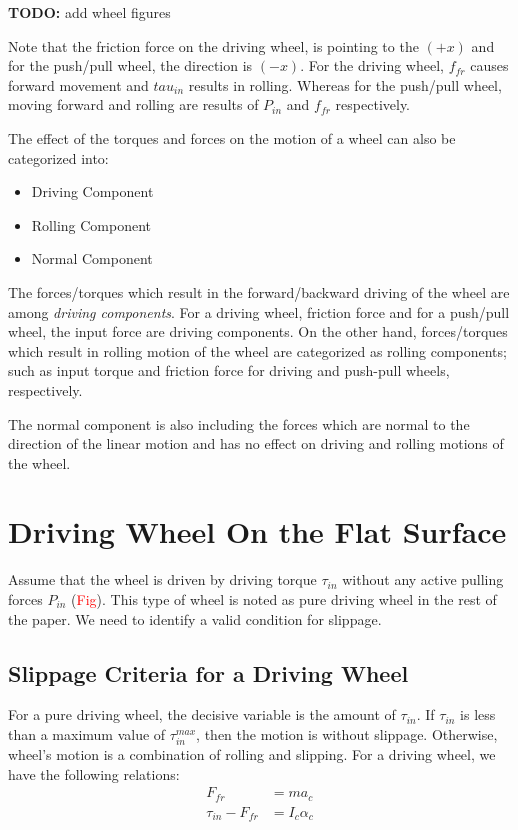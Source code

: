 \documentclass[letterpaper, 10pt, conference]{ieeeconf}
\newcommand{\TODO}[1]{{\color{red} {\bf TODO:} {#1}}}
\begin{document}
\TODO{add wheel figures}

Note that the friction force on the driving wheel, is pointing to the $(+x)$ and for the push/pull wheel, the direction is $(-x)$. For the driving wheel, $f_{fr}$ causes forward movement and $tau_{in}$ results in rolling. Whereas for the push/pull wheel, moving forward and rolling are results of $P_{in}$ and $f_{fr}$ respectively.

The effect of the torques and forces on the motion of a wheel can also be categorized into:
\begin{itemize}
\item Driving Component
\item Rolling Component
\item Normal Component
\end{itemize}

The forces/torques which result in the forward/backward driving of the wheel are among \emph{driving components}. For a driving wheel, friction force and for a push/pull wheel, the input force are driving components. On the other hand, forces/torques which result in rolling motion of the wheel are categorized as rolling components; such as input torque and friction force for driving and push-pull wheels, respectively.

The normal component is also including the forces which are normal to the direction of the linear motion and has no effect on driving and rolling motions of the wheel.
\section{Driving Wheel On the Flat Surface} \label{DrivingWheel}

Assume that the wheel is driven by driving torque $\tau_{in}$ without any active pulling forces $P_{in}$ (\textcolor{red}{Fig}). This type of wheel is noted as pure driving wheel in the rest of the paper. We need to identify a valid condition for slippage. 

\subsection{Slippage Criteria for a Driving Wheel} \label{SlipCri-DW}

For a pure driving wheel, the decisive variable is the amount of $\tau_{in}$. If $\tau_{in}$ is less than a maximum value of $\tau_{in}^{max}$, then the motion is without slippage. Otherwise, wheel's motion is a combination of rolling and slipping. For a driving wheel, we have the following relations:
\begin{align}
F_{fr} &= ma_c \label{f_fr}\\
\tau_{in} - F_{fr} &= I_c \alpha_c \label{moment_eq}
\end{align}
\end{document}

